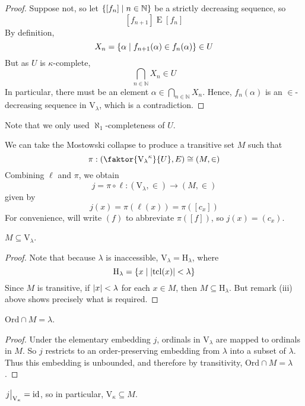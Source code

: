 \begin{proof}
    Suppose not, so let \( \qty{[f_n] \mid n \in \mathbb N} \) be a strictly decreasing sequence, so
    \[ [f_{n+1}] \mathrel{E} [f_n] \]
    By definition,
    \[ X_n = \qty{\alpha \mid f_{n+1}(\alpha) \in f_n(\alpha)} \in U \]
    But as \( U \) is \( \kappa \)-complete,
    \[ \bigcap_{n \in \mathbb N} X_n \in U \]
    In particular, there must be an element \( \alpha \in \bigcap_{n \in \mathbb N} X_n \).
    Hence, \( f_n(\alpha) \) is an \( \in \)-decreasing sequence in \( \mathrm{V}_\lambda \), which is a contradiction.
\end{proof}
Note that we only used \( \aleph_1 \)-completeness of \( U \).

We can take the Mostowski collapse to produce a transitive set \( M \) such that
\[ \pi : \qty(\faktor{{\mathrm{V}_\lambda}^\kappa}{U}, E) \cong (M, \in) \]
Combining \( \ell \) and \( \pi \), we obtain
\[ j = \pi \circ \ell : (\mathrm{V}_\lambda, \in) \to (M, \in) \]
given by
\[ j(x) = \pi(\ell(x)) = \pi([c_x]) \]
For convenience, will write \( (f) \) to abbreviate \( \pi([f]) \), so \( j(x) = (c_x) \).
\begin{lemma}
    \( M \subseteq \mathrm{V}_\lambda \).
\end{lemma}
\begin{proof}
    Note that because \( \lambda \) is inaccessible, \( \mathrm{V}_\lambda = \mathrm{H}_\lambda \), where
    \[ \mathrm{H}_\lambda = \qty{x \mid \abs{\operatorname{tcl}(x)} < \lambda} \]
    Since \( M \) is transitive, if \( \abs{x} < \lambda \) for each \( x \in M \), then \( M \subseteq \mathrm{H}_\lambda \).
    But remark (iii) above shows precisely what is required.
\end{proof}
\begin{lemma}
    \( \mathrm{Ord} \cap M = \lambda \).
\end{lemma}
\begin{proof}
    Under the elementary embedding \( j \), ordinals in \( \mathrm{V}_\lambda \) are mapped to ordinals in \( M \).
    So \( j \) restricts to an order-preserving embedding from \( \lambda \) into a subset of \( \lambda \).
    Thus this embedding is unbounded, and therefore by transitivity, \( \mathrm{Ord} \cap M = \lambda \).
\end{proof}
\begin{lemma}
    \( \eval{j}_{\mathrm{V}_\kappa} = \id \), so in particular, \( \mathrm{V}_\kappa \subseteq M \).
\end{lemma}
